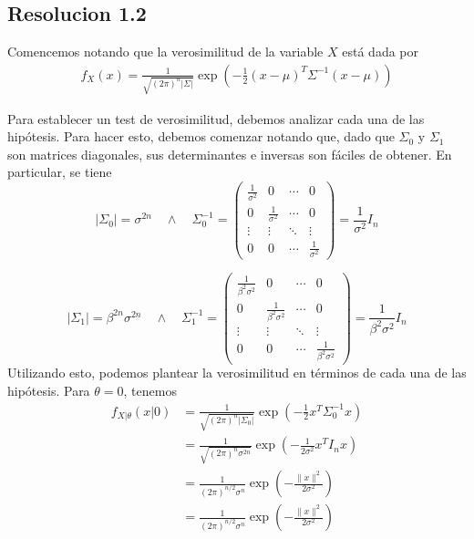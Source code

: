 \documentclass[
  11pt,
  letterpaper,
   addpoints,
   answers
  ]{exam}
\begin{document}
\begin{questions}
\begin{solution}
        \subsection*{Resolucion 1.2}
        Comencemos notando que la verosimilitud de la variable \(X\) está dada por
        \begin{align}
        f_X(x) = \frac{1}{\sqrt{(2\pi)^n |\Sigma|}} \exp\left( -\frac{1}{2} (x - \mu)^T \Sigma^{-1} (x - \mu) \right)
        \end{align}
        
        Para establecer un test de verosimilitud, debemos analizar cada una de las hipótesis. Para hacer esto, debemos comenzar notando que, dado que \(\Sigma_0\) y \(\Sigma_1\) son matrices diagonales, sus determinantes e inversas son fáciles de obtener. En particular, se tiene
    \[
|\Sigma_0| = \sigma^{2n} \quad \land \quad \Sigma_0^{-1} = 
\begin{pmatrix}
\frac{1}{\sigma^2} & 0 & \cdots & 0 \\
0 & \frac{1}{\sigma^2} & \cdots & 0 \\
\vdots & \vdots & \ddots & \vdots \\
0 & 0 & \cdots & \frac{1}{\sigma^2}
\end{pmatrix} = \frac{1}{\sigma^2} I_n
\]

\[
|\Sigma_1| = \beta^{2n} \sigma^{2n} \quad \land \quad \Sigma_1^{-1} = 
\begin{pmatrix}
\frac{1}{\beta^2 \sigma^2} & 0 & \cdots & 0 \\
0 & \frac{1}{\beta^2 \sigma^2} & \cdots & 0 \\
\vdots & \vdots & \ddots & \vdots \\
0 & 0 & \cdots & \frac{1}{\beta^2 \sigma^2}
\end{pmatrix} = \frac{1}{\beta^2 \sigma^2} I_n
\]
Utilizando esto, podemos plantear la verosimilitud en términos de cada una de las hipótesis. Para \(\theta = 0\), tenemos
\begin{align}
f_{X|\theta}(x|0) &= \frac{1}{\sqrt{(2\pi)^n |\Sigma_0|}} \exp\left( -\frac{1}{2} x^T \Sigma_0^{-1} x \right) \tag{13} \\
&= \frac{1}{\sqrt{(2\pi)^n \sigma^{2n}}} \exp\left( -\frac{1}{2 \sigma^2} x^T I_n x \right) \tag{14} \\
&= \frac{1}{(2\pi)^{n/2} \sigma^n} \exp\left( -\frac{\|x\|^2}{2 \sigma^2} \right) \tag{15} \\
&= \frac{1}{(2\pi)^{n/2} \sigma^n} \exp\left( -\frac{\|x\|^2}{2 \sigma^2} \right) \tag{16}
\end{align}


\end{solution}
\end{questions}
\end{document}

